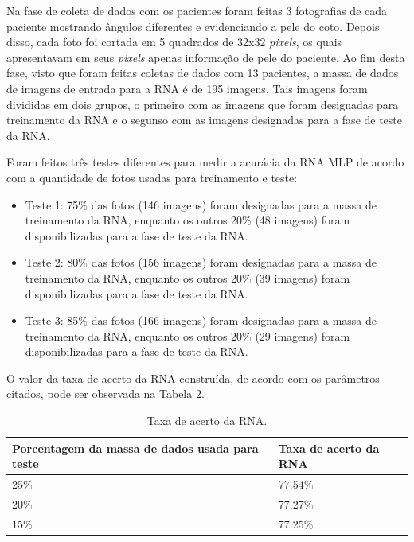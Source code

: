 		Na fase de coleta de dados com os pacientes foram feitas 3 fotografias de cada paciente mostrando ângulos diferentes e evidenciando a pele do coto. Depois disso, cada foto foi cortada em 5 quadrados de 32x32 \textit{pixels}, os quais apresentavam em seus \textit{pixels} apenas informação de pele do paciente. Ao fim desta fase, visto que foram feitas coletas de dados com 13 pacientes, a massa de dados de imagens de entrada para a RNA é de 195 imagens. Tais imagens foram divididas em dois grupos, o primeiro com as imagens que foram designadas para treinamento da RNA e o segunso com as imagens designadas para a fase de teste da RNA. 

		Foram feitos três testes diferentes para medir a acurácia da RNA MLP de acordo com a quantidade de fotos usadas para treinamento e teste:
		\begin{itemize}
			\item Teste 1: 75\% das fotos (146 imagens) foram designadas para a massa de treinamento da RNA, enquanto os outros 20\% (48 imagens) foram disponibilizadas para a fase de teste da RNA. 
			\item Teste 2: 80\% das fotos (156 imagens) foram designadas para a massa de treinamento da RNA, enquanto os outros 20\% (39 imagens) foram disponibilizadas para a fase de teste da RNA. 
			\item Teste 3: 85\% das fotos (166 imagens) foram designadas para a massa de treinamento da RNA, enquanto os outros 20\% (29 imagens) foram disponibilizadas para a fase de teste da RNA. 
		\end{itemize}

		O valor da taxa de acerto da RNA construída, de acordo com os parâmetros citados, pode ser observada na Tabela 2. 

		\begin{table}[H]
			\centering
			\caption{Taxa de acerto da RNA.}
			\label{tab02}
			\begin{tabular}{|l|l|}
				\hline
				Porcentagem da massa de dados usada para teste & Taxa de acerto da RNA \\ \hline
				25\%                                           & 77.54\%               \\ \hline
				20\%                                           & 77.27\%               \\ \hline
				15\%                                           & 77.25\%               \\ \hline
			\end{tabular}
			
		\end{table}

